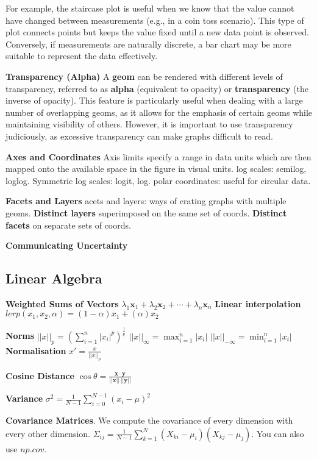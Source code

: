\documentclass{article}
\begin{document}
\noindent For example, the staircase plot is useful when we know that the value cannot have changed between measurements (e.g., in a coin toss scenario).
This type of plot connects points but keeps the value fixed until a new data point is observed.
Conversely, if measurements are naturally discrete, a bar chart may be more suitable to represent the data effectively.

\noindent \textbf{Transparency (Alpha)}
\noindent A \textbf{geom} can be rendered with different levels of transparency,
referred to as \textbf{alpha} (equivalent to opacity) or
\textbf{transparency} (the inverse of opacity).
This feature is particularly useful when dealing with a large number
of overlapping geoms, as it allows for the emphasis of certain geoms
while maintaining visibility of others.
However, it is important to use transparency judiciously, as excessive
transparency can make graphs difficult to read.

\noindent \textbf{Axes and Coordinates}
Axis limits specify a range in data units which are then mapped onto the available space in the figure in visual units.
log scales: semilog, loglog. Symmetric log scales: logit, log.
polar coordinates: useful for circular data.

\noindent \textbf{Facets and Layers}
acets and layers: ways of crating graphs with multiple geoms.
\textbf{Distinct layers} superimposed on the same set of coords.
\textbf{Distinct facets} on separate sets of coords.

\noindent \textbf{Communicating Uncertainty}


\subsection*{Linear Algebra}

\noindent \textbf{Weighted Sums of Vectors}
$\lambda_1 \mathbf{x}_1 + \lambda_2 \mathbf{x}_2 + \cdots + \lambda_n \mathbf{x}_n$
\textbf{Linear interpolation}
$lerp(x_1, x_2, \alpha) = (1 - \alpha)x_1 + (\alpha)x_2$

\noindent \textbf{Norms}
$||x||_p = {(\sum_{i=1}^{n} |x_i|^p)}^{\frac{1}{p}}$
$||x||_\infty = \max_{i=1}^{n} |x_i|$
$||x||_{-\infty} = \min_{i=1}^{n} |x_i|$
\textbf{Normalisation} $x' = \frac{x}{||x||_p}$

\noindent \textbf{Cosine Distance}
$\cos \theta = \frac{\mathbf{x} \cdot \mathbf{y}}{||\mathbf{x}|| \, ||\mathbf{y}||}$

\noindent \textbf{Variance}
$\sigma^2 = \frac{1}{N - 1} \sum_{i=0}^{N-1} {(x_i - \mu)}^2$

\noindent \textbf{Covariance Matrices}.
We compute the covariance of every dimension with every other dimension.
$\Sigma_{ij} = \frac{1}{N - 1} \sum_{k=1}^{N} (X_{ki} - \mu_i)(X_{kj} - \mu_j)$.
You can also use $np.cov$.
\end{document}
